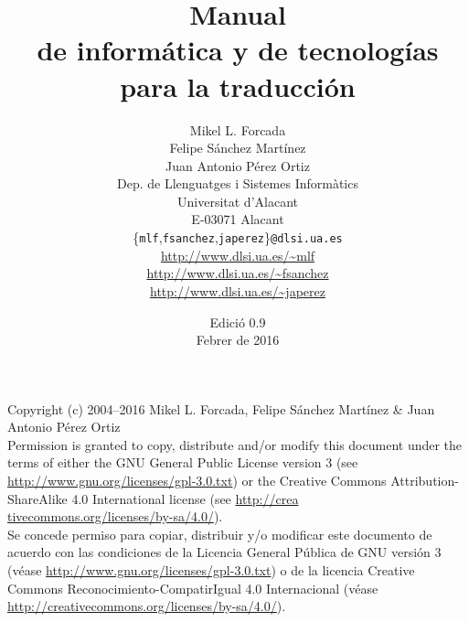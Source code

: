 \documentclass[11pt,a4paper]{book}
\begin{document}
 \frontmatter

\title{\bf Manual \\ de informática y de tecnologías\\ para la traducción} 

\author{Mikel L. Forcada\\Felipe Sánchez Martínez\\Juan Antonio Pérez Ortiz\\[2ex] Dep. de Llenguatges i Sistemes Informàtics\\ Universitat d'Alacant\\ E-03071 Alacant\\[2ex] \{\texttt{mlf},\texttt{fsanchez},\texttt{japerez}\}\texttt{@dlsi.ua.es} \\[2ex] \url{http://www.dlsi.ua.es/~mlf} \\ \url{http://www.dlsi.ua.es/~fsanchez} \\ \url{http://www.dlsi.ua.es/~japerez} } \date{Edició 0.9\\ Febrer de 2016} \maketitle

\newpage

\noindent Copyright (c) 2004--2016 Mikel L. Forcada, Felipe Sánchez Martínez \& Juan Antonio Pérez Ortiz \\[0.3cm] 

\noindent Permission is granted to copy, distribute and/or modify this document under the terms of either the GNU General Public License version 3 (see \url{http://www.gnu.org/licenses/gpl-3.0.txt}) or the Creative Commons Attribution-ShareAlike 4.0 International license (see \url{http://crea} \url{tivecommons.org/licenses/by-sa/4.0/}). \\[0.3cm] 

\noindent Se concede permiso para copiar, distribuir y/o modificar este documento de acuerdo con las condiciones de la Licencia General Pública de GNU versión 3 (véase \url{http://www.gnu.org/licenses/gpl-3.0.txt}) o de la licencia Creative Commons Reconocimiento-CompatirIgual 4.0 Internacional (véase \url{http://creativecommons.org/licenses/by-sa/4.0/}). 

\maketitle
\end{document}
